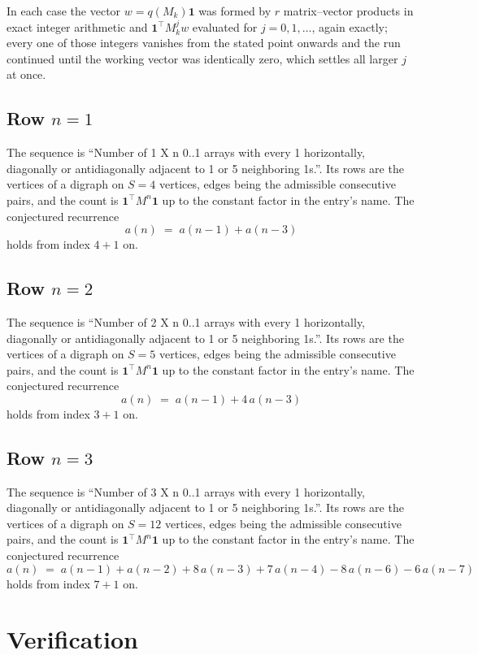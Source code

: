 \documentclass[11pt,a4paper]{article}
\theoremstyle{plain}
\theoremstyle{definition}
\begin{document}
In each case the vector $w=q(M_k)\mathbf{1}$ was formed by $r$ matrix--vector products in
exact integer arithmetic and $\mathbf{1}^{\!\top}M_k^{j}w$ evaluated for $j=0,1,\dots$,
again exactly; every one of those integers vanishes from the stated point onwards and the run
continued until the working vector was identically zero, which settles all larger $j$ at once.

\subsection*{Row $n$$=1$}
The sequence is ``Number of 1 X n 0..1 arrays with every 1 horizontally, diagonally or antidiagonally adjacent to 1 or 5 neighboring 1s.''. Its rows are the vertices of a digraph on
$S=4$ vertices, edges being the admissible consecutive pairs, and the count is
$\mathbf{1}^{\!\top}M^{n}\mathbf{1}$ up to the constant factor in the entry's name.
The conjectured recurrence
\[
a(n)\;=\;a(n-1) + a(n-3)
\]
holds from index $4+1$ on.

\subsection*{Row $n$$=2$}
The sequence is ``Number of 2 X n 0..1 arrays with every 1 horizontally, diagonally or antidiagonally adjacent to 1 or 5 neighboring 1s.''. Its rows are the vertices of a digraph on
$S=5$ vertices, edges being the admissible consecutive pairs, and the count is
$\mathbf{1}^{\!\top}M^{n}\mathbf{1}$ up to the constant factor in the entry's name.
The conjectured recurrence
\[
a(n)\;=\;a(n-1) + 4\,a(n-3)
\]
holds from index $3+1$ on.

\subsection*{Row $n$$=3$}
The sequence is ``Number of 3 X n 0..1 arrays with every 1 horizontally, diagonally or antidiagonally adjacent to 1 or 5 neighboring 1s.''. Its rows are the vertices of a digraph on
$S=12$ vertices, edges being the admissible consecutive pairs, and the count is
$\mathbf{1}^{\!\top}M^{n}\mathbf{1}$ up to the constant factor in the entry's name.
The conjectured recurrence
\[
a(n)\;=\;a(n-1) + a(n-2) + 8\,a(n-3) + 7\,a(n-4) - 8\,a(n-6) - 6\,a(n-7)
\]
holds from index $7+1$ on.

\section{Verification}
\end{document}
